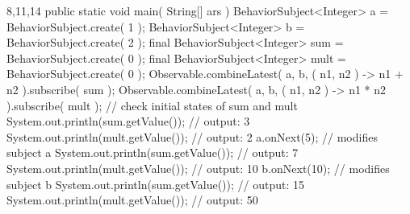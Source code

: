 \begin{javacode}{8,11,14}
public static void main( String[] ars ) {
    BehaviorSubject<Integer> a = BehaviorSubject.create( 1 );
    BehaviorSubject<Integer> b = BehaviorSubject.create( 2 );
    final BehaviorSubject<Integer> sum = BehaviorSubject.create( 0 );
    final BehaviorSubject<Integer> mult = BehaviorSubject.create( 0 );
    Observable.combineLatest( a, b, ( n1, n2 ) -> n1 + n2 ).subscribe( sum );
    Observable.combineLatest( a, b, ( n1, n2 ) -> n1 * n2 ).subscribe( mult );
    // check initial states of sum and mult
    System.out.println(sum.getValue()); // output: 3
    System.out.println(mult.getValue()); // output: 2
    a.onNext(5); // modifies subject a
    System.out.println(sum.getValue()); // output: 7
    System.out.println(mult.getValue()); // output: 10
    b.onNext(10); // modifies subject b
    System.out.println(sum.getValue()); // output: 15
    System.out.println(mult.getValue()); // output: 50
}
\end{javacode}